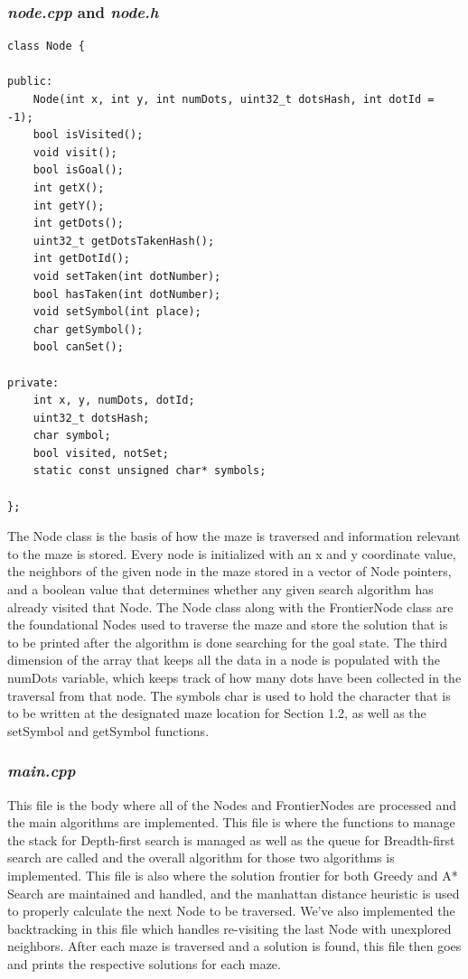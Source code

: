 \documentclass[titlepage]{article}
\begin{document}
\subsubsection{\textit{node.cpp} and \textit{node.h}}
\begin{lstlisting}
class Node {

public:
    Node(int x, int y, int numDots, uint32_t dotsHash, int dotId = -1);
    bool isVisited();
    void visit();
    bool isGoal();
    int getX();
    int getY();
    int getDots();
    uint32_t getDotsTakenHash();
    int getDotId();
    void setTaken(int dotNumber);
    bool hasTaken(int dotNumber);
    void setSymbol(int place);
    char getSymbol();
    bool canSet();

private:
    int x, y, numDots, dotId;
    uint32_t dotsHash;
    char symbol;
    bool visited, notSet;
    static const unsigned char* symbols;

};
\end{lstlisting}
The Node class is the basis of how the maze is traversed and information relevant to the maze is stored. Every node is initialized with an x and y coordinate value, the neighbors of the given node in the maze stored in a vector of Node pointers, and a boolean value that determines whether any given search algorithm has already visited that Node. The Node class along with the FrontierNode class are the foundational Nodes used to traverse the maze and store the solution that is to be printed after the algorithm is done searching for the goal state. The third dimension of the array that keeps all the data in a node is populated with the numDots variable, which keeps track of how many dots have been collected in the traversal from that node. The symbols char is used to hold the character that is to be written at the designated maze location for Section 1.2, as well as the setSymbol and getSymbol functions.

\subsubsection{\textit{main.cpp}}
This file is the body where all of the Nodes and FrontierNodes are processed and the main algorithms are implemented. This file is where the functions to manage the stack for Depth-first search is managed as well as the queue for Breadth-first search are called and the overall algorithm for those two algorithms is implemented. This file is also where the solution frontier for both Greedy and A* Search are maintained and handled, and the manhattan distance heuristic is used to properly calculate the next Node to be traversed. We've also implemented the backtracking in this file which handles re-visiting the last Node with unexplored neighbors. After each maze is traversed and a solution is found, this file then goes and prints the respective solutions for each maze.
\end{document}

